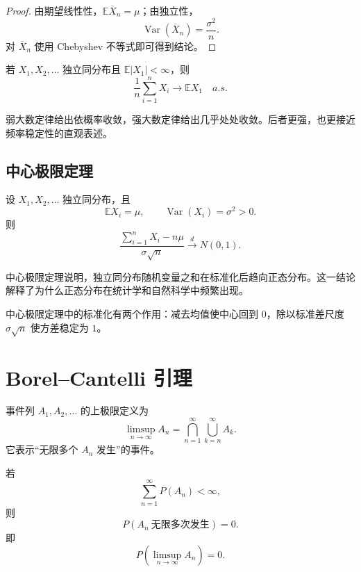 \begin{proof}
由期望线性性，$\mathbb{E}\overline X_n=\mu$；由独立性，
\[
    \operatorname{Var}(\overline X_n)=\frac{\sigma^2}{n}.
\]
对 $\overline X_n$ 使用 Chebyshev 不等式即可得到结论。
\end{proof}

\begin{theorem}[强大数定律]
若 $X_1,X_2,\dots$ 独立同分布且 $\mathbb{E}|X_1|<\infty$，则
\[
    \frac1n\sum_{i=1}^n X_i\to\mathbb{E}X_1
    \quad a.s.
\]
\end{theorem}

\begin{remark}
弱大数定律给出依概率收敛，强大数定律给出几乎处处收敛。后者更强，也更接近频率稳定性的直观表述。
\end{remark}

\subsection{中心极限定理}

\begin{theorem}
设 $X_1,X_2,\dots$ 独立同分布，且
\[
    \mathbb{E}X_i=\mu,
    \qquad
    \operatorname{Var}(X_i)=\sigma^2>0.
\]
则
\[
    \frac{\sum_{i=1}^n X_i-n\mu}{\sigma\sqrt n}
    \xrightarrow{d}N(0,1).
\]
\end{theorem}

中心极限定理说明，独立同分布随机变量之和在标准化后趋向正态分布。这一结论解释了为什么正态分布在统计学和自然科学中频繁出现。

\begin{remark}
中心极限定理中的标准化有两个作用：减去均值使中心回到 $0$，除以标准差尺度 $\sigma\sqrt n$ 使方差稳定为 $1$。
\end{remark}

\section{Borel--Cantelli 引理}

\begin{definition}[事件的上极限]
事件列 $A_1,A_2,\dots$ 的上极限定义为
\[
    \limsup_{n\to\infty}A_n
    =\bigcap_{n=1}^{\infty}\bigcup_{k=n}^{\infty}A_k.
\]
它表示“无限多个 $A_n$ 发生”的事件。
\end{definition}

\begin{theorem}
若
\[
    \sum_{n=1}^{\infty}P(A_n)<\infty,
\]
则
\[
    P(A_n\ \text{无限多次发生})=0.
\]
即
\[
    P\left(\limsup_{n\to\infty}A_n\right)=0.
\]
\end{theorem}

